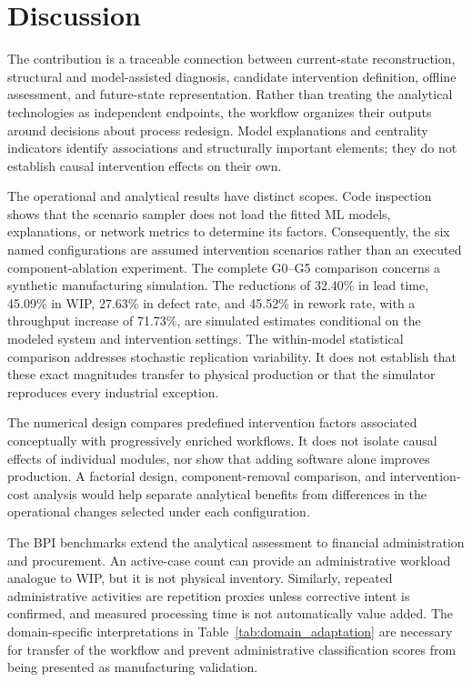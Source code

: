 \documentclass[pdflatex,iicol,Numbered,sn-basic]{sn-jnl}
\begin{document}
\section{Discussion}
\label{sec:discussion}

The contribution is a traceable connection between current-state reconstruction, structural and model-assisted diagnosis, candidate intervention definition, offline assessment, and future-state representation. Rather than treating the analytical technologies as independent endpoints, the workflow organizes their outputs around decisions about process redesign. Model explanations and centrality indicators identify associations and structurally important elements; they do not establish causal intervention effects on their own.

The operational and analytical results have distinct scopes. Code inspection shows that the scenario sampler does not load the fitted ML models, explanations, or network metrics to determine its factors. Consequently, the six named configurations are assumed intervention scenarios rather than an executed component-ablation experiment. The complete G0--G5 comparison concerns a synthetic manufacturing simulation. The reductions of 32.40\% in lead time, 45.09\% in WIP, 27.63\% in defect rate, and 45.52\% in rework rate, with a throughput increase of 71.73\%, are simulated estimates conditional on the modeled system and intervention settings. The within-model statistical comparison addresses stochastic replication variability. It does not establish that these exact magnitudes transfer to physical production or that the simulator reproduces every industrial exception.

The numerical design compares predefined intervention factors associated conceptually with progressively enriched workflows. It does not isolate causal effects of individual modules, nor show that adding software alone improves production. A factorial design, component-removal comparison, and intervention-cost analysis would help separate analytical benefits from differences in the operational changes selected under each configuration.

The BPI benchmarks extend the analytical assessment to financial administration and procurement. An active-case count can provide an administrative workload analogue to WIP, but it is not physical inventory. Similarly, repeated administrative activities are repetition proxies unless corrective intent is confirmed, and measured processing time is not automatically value added. The domain-specific interpretations in Table~\ref{tab:domain_adaptation} are necessary for transfer of the workflow and prevent administrative classification scores from being presented as manufacturing validation.
\end{document}
